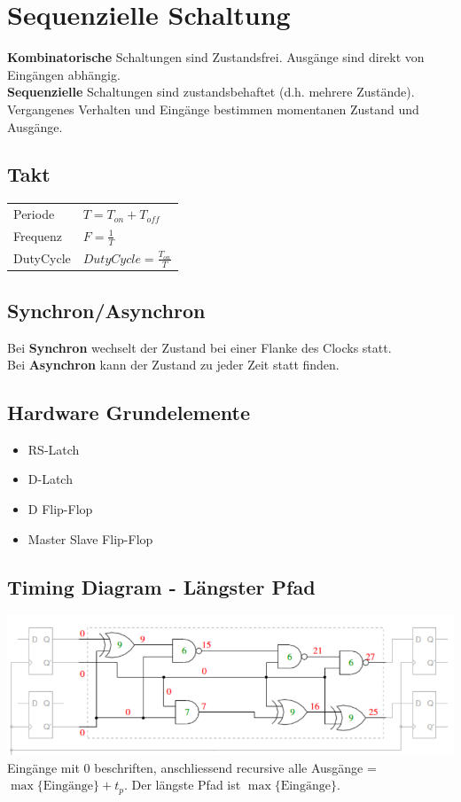 \section{Sequenzielle Schaltung}
\textbf{Kombinatorische} Schaltungen sind Zustandsfrei. Ausgänge sind direkt von Eingängen abhängig.\\
\textbf{Sequenzielle} Schaltungen sind zustandsbehaftet (d.h. mehrere Zustände). Vergangenes Verhalten und Eingänge bestimmen momentanen Zustand und Ausgänge.

\subsection{Takt}
\begin{tabular}{ll}
	Periode & $T = T_{on} + T_{off}$ \\
	Frequenz &  $F = \frac{1}{T}$ \\
	DutyCycle &  $DutyCycle = \frac{T_{on}}{T}$ \\
\end{tabular}

\subsection{Synchron/Asynchron}
Bei \textbf{Synchron} wechselt der Zustand bei einer Flanke des Clocks statt.\\
Bei \textbf{Asynchron} kann der Zustand zu jeder Zeit statt finden.

\subsection{Hardware Grundelemente}
\begin{itemize}[nosep]
	\item RS-Latch
	\item D-Latch
	\item D Flip-Flop
	\item Master Slave Flip-Flop
\end{itemize}

\subsection{Timing Diagram - Längster Pfad}
\begin{minipage}{\columnwidth}
	\includegraphics[width=\columnwidth,keepaspectratio=true]{./Images/pfad.png}\\
	Eingänge mit $0$ beschriften, anschliessend recursive alle Ausgänge = $\max\{\text{Eingänge}\} + t_p$. Der längste Pfad ist $\max\{\text{Eingänge}\}$.
\end{minipage}